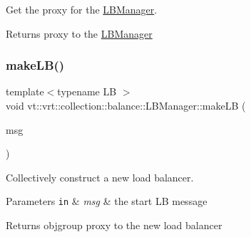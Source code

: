 Get the proxy for the \hyperlink{structvt_1_1vrt_1_1collection_1_1balance_1_1_l_b_manager}{L\+B\+Manager}. 

\begin{DoxyReturn}{Returns}
proxy to the {\ttfamily \hyperlink{structvt_1_1vrt_1_1collection_1_1balance_1_1_l_b_manager}{L\+B\+Manager}} 
\end{DoxyReturn}
\mbox{\label{structvt_1_1vrt_1_1collection_1_1balance_1_1_l_b_manager_ab0499f916a5597bf2a0ed29dc295cb75}} 
\subsubsection{\texorpdfstring{make\+L\+B()}{makeLB()}}
{\footnotesize\ttfamily template$<$typename LB $>$ \\
void vt\+::vrt\+::collection\+::balance\+::\+L\+B\+Manager\+::make\+LB (\begin{DoxyParamCaption}\item[{\hyperlink{namespacevt_ab2b3d506ec8e8d1540aede826d84a239}{Msg\+Shared\+Ptr}$<$ \hyperlink{structvt_1_1vrt_1_1collection_1_1balance_1_1_start_l_b_msg}{Start\+L\+B\+Msg} $>$}]{msg }\end{DoxyParamCaption})\hspace{0.3cm}{\ttfamily [protected]}}



Collectively construct a new load balancer. 


\begin{DoxyParams}[1]{Parameters}
\mbox{\tt in}  & {\em msg} & the start LB message\\
\hline
\end{DoxyParams}
\begin{DoxyReturn}{Returns}
objgroup proxy to the new load balancer 
\end{DoxyReturn}
\mbox{\label{structvt_1_1vrt_1_1collection_1_1balance_1_1_l_b_manager_a8e18e972cf9e8658da9577d45e090698}} 
